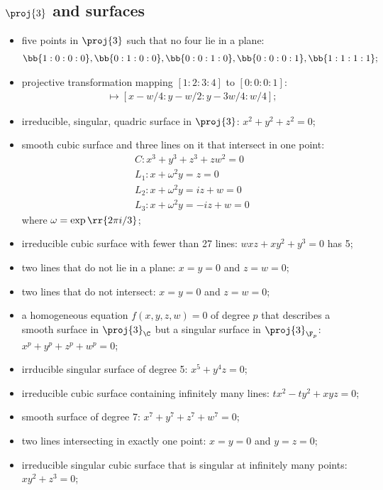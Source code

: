 \documentclass{article}
\begin{document}
\subsection{$\proj{3}$ and surfaces}

\begin{itemize}
  \item five points in $\proj{3}$ such that no four lie in a plane:
    \begin{align*}
      \bb{1:0:0:0}, \bb{0:1:0:0}, \bb{0:0:1:0}, \bb{0:0:0:1}, \bb{1:1:1:1};
    \end{align*}
  \item projective transformation mapping $[1:2:3:4]$ to $[0:0:0:1]$:
    \begin{align*}
      [x:y:z:w]\mapsto [x-w/4:y-w/2:y-3w/4:w/4];
    \end{align*}
  \item irreducible, singular, quadric surface in $\proj{3}$:
    $x^2 + y^2 + z^2 = 0$;
  \item smooth cubic surface and three lines on it that intersect
    in one point:
    \begin{align*}
      C:x^3 + y^3 + z^3 + zw^2 = 0\\
      L_1 : x + \omega^2 y = z = 0\\
      L_2 : x + \omega^2 y = iz + w = 0\\
      L_3 : x +\omega^2 y = -iz + w = 0
    \end{align*}
    where $\omega = \exp\rr{2\pi i/3}$;
  \item irreducible cubic surface with fewer than 27 lines:
    $wxz + xy^2 + y^3 = 0$ has 5;
  \item two lines that do not lie in a plane: $x=y=0$ and
    $z=w=0$;
  \item two lines that do not intersect: $x=y=0$ and
    $z=w=0$;
  \item a homogeneous equation $f(x,y,z,w)=0$ of degree $p$ that describes
    a smooth surface in $\proj{3}_\C$ but a singular surface in
    $\proj{3}_{\F_p}$: $x^p + y^p + z^p + w^p = 0$;
  \item irrducible singular surface of degree 5: $x^5 + y^4z = 0$;
  \item irreducible cubic surface containing infinitely many lines:
    $tx^2 - ty^2 + xyz = 0$;
  \item smooth surface of degree 7: $x^7 + y^7 + z^7 + w^7 = 0$;
  \item two lines intersecting in exactly one point:
    $x=y=0$ and $y=z=0$;
  \item irreducible singular cubic surface that is singular
    at infinitely many points: $xy^2 + z^3 = 0$;
\end{itemize}
\end{document}
